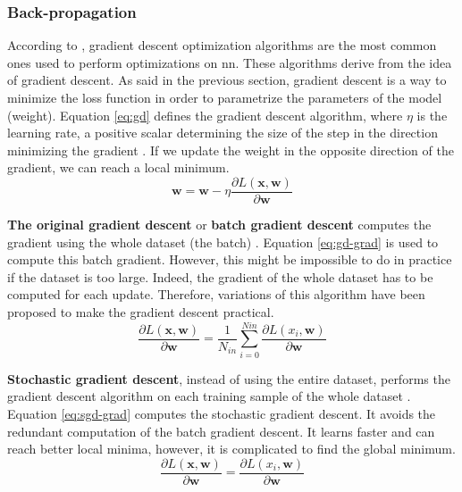 \subsubsection{Back-propagation} \label{subs:trainbackward}
According to \textcite{ruder_overview_2017}, gradient descent optimization algorithms are the most common ones used to perform optimizations on \acrshort{nn}. These algorithms derive from the idea of gradient descent. As said in the previous section, gradient descent is a way to minimize the loss function in order to parametrize the parameters of the model (weight). Equation \eqref{eq:gd} defines the gradient descent algorithm, where $\eta$ is the learning rate, a positive scalar determining the size of the step in the direction minimizing the gradient \cite{goodfellow_deep_2016, ruder_overview_2017}. If we update the weight in the opposite direction of the gradient, we can reach a local minimum.
%
\begin{equation}
    \boldsymbol{w} = \boldsymbol{w} - \eta \frac{ \partial L( \boldsymbol{x}, \boldsymbol{w} ) }{\partial \boldsymbol{w}}
    \label{eq:gd}
\end{equation}

\textbf{The original gradient descent} or \textbf{batch gradient descent} computes the gradient using the whole dataset (the batch) \cite{matteucci_artificial_2019, ruder_overview_2017,}. Equation \eqref{eq:gd-grad} is used to compute this batch gradient. However, this might be impossible to do in practice if the dataset is too large. Indeed, the gradient of the whole dataset has to be computed for each update. Therefore, variations of this algorithm have been proposed to make the gradient descent practical.
%
\begin{equation}
    \frac{ \partial L( \boldsymbol{x}, \boldsymbol{w} ) }{\partial \boldsymbol{w}} = \frac{1}{N_{in}} \sum^{Nin}_{i = 0} \frac{ \partial L( x_i, \boldsymbol{w} ) }{\partial \boldsymbol{w}}
    \label{eq:gd-grad}
\end{equation}

\textbf{Stochastic gradient descent}, instead of using the entire dataset, performs the gradient descent algorithm on each training sample of the whole dataset \cite{ruder_overview_2017, matteucci_artificial_2019}. Equation \eqref{eq:sgd-grad} computes the stochastic gradient descent. It avoids the redundant computation of the batch gradient descent. It learns faster and can reach better local minima, however, it is complicated to find the global minimum.
%
\begin{equation}
    \frac{ \partial L( \boldsymbol{x}, \boldsymbol{w} ) }{\partial \boldsymbol{w}} = \frac{ \partial L( x_i, \boldsymbol{w} ) }{\partial \boldsymbol{w}}
    \label{eq:sgd-grad}
\end{equation}

